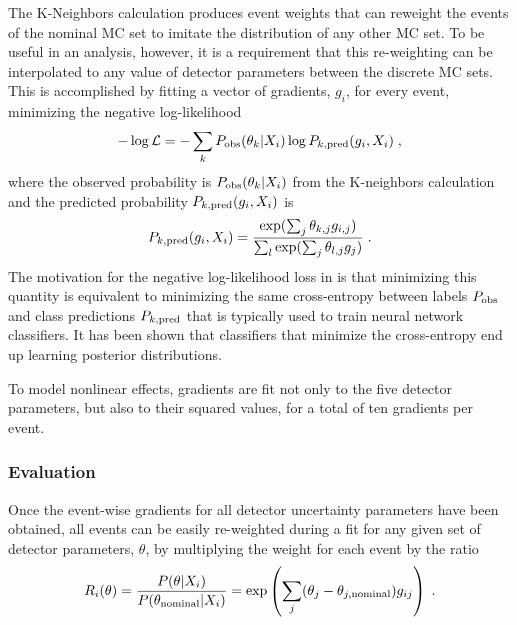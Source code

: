 The K-Neighbors calculation produces event weights that can reweight the events of the nominal MC set to imitate the distribution of any other MC set.
To be useful in an analysis, however, it is a requirement that this re-weighting can be interpolated to any value of detector parameters between the discrete MC sets.
This is accomplished by fitting a vector of gradients, $g_i$, for every event, minimizing the negative log-likelihood
\begin{equation}
    -\log\mathcal{L} = -\sum_k P_{\rm obs}(\theta_k | X_i) \log P_{k, \rm pred}(g_i, X_i)\;, \label{eq:grad-nllh}
\end{equation}
where the observed probability is $P_{\rm obs}(\theta_k | X_i)$ from the K-neighbors calculation and the  predicted probability $P_{k, \rm pred}(g_i, X_i)$ is
\begin{equation}
    P_{k, \rm pred}(g_i, X_i) = \frac{\exp(\sum_j \theta_{k,j} g_{i,j})}{\sum_l\exp(\sum_j \theta_{l,j} g_j)}\;.
\end{equation}
The motivation for the negative log-likelihood loss in  is that minimizing this quantity is equivalent to minimizing the same cross-entropy between labels $P_{\rm obs}$ and class predictions $P_{k, \rm pred}$ that is typically used to train neural network classifiers.
It has been shown that classifiers that minimize the cross-entropy end up learning posterior distributions\cite{NNPosteriors}.

To model nonlinear effects, gradients are fit not only to the five detector parameters, but also to their squared values, for a total of ten gradients per event.

\subsubsection{Evaluation}
Once the event-wise gradients for all detector uncertainty parameters have been obtained, all events can be easily re-weighted during a fit for any given set of detector parameters, $\theta$, by multiplying the weight for each event by the ratio
\begin{equation}
    R_i(\theta)=\frac{P(\theta|X_i)}{P(\theta_{\rm nominal}|X_i)}=\exp\left(\sum_j (\theta_j - \theta_{j, \rm nominal}) g_{ij}\right)\;.\label{eq:ultrasurf-eval}
\end{equation}

